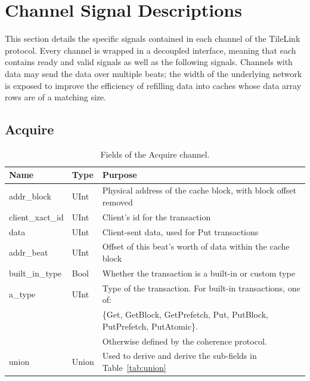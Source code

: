 \section{Channel Signal Descriptions}
\label{s.types}

This section details the specific signals contained in each channel of the TileLink protocol.
Every channel is wrapped in a decoupled interface, meaning that each contains ready and valid signals as well as the following signals.
Channels with data may send the data over multiple beats; the width of the underlying network is exposed to improve the efficiency of refilling data into caches whose data array rows are of a matching size.

\subsection{Acquire}

\begin{table}[ht]
\begin{center}
\begin{tabular}{|l|l|l|}
    \hline
    Name & Type & Purpose \\ \hline \hline
addr\_block & UInt & Physical address of the cache block, with block offset removed \\ \hline
client\_xact\_id & UInt & Client's id for the transaction \\ \hline
data & UInt & Client-sent data, used for Put transactions \\ \hline
addr\_beat & UInt & Offset of this beat's worth of data within the cache block \\ \hline
built\_in\_type & Bool & Whether the transaction is a built-in or custom type \\ \hline
a\_type & UInt & Type of the transaction. For built-in transactions, one of: \\
        &      & \{Get, GetBlock, GetPrefetch, Put, PutBlock, PutPrefetch, PutAtomic\}. \\
        &      &  Otherwise defined by the coherence protocol. \\ \hline
union & Union & Used to derive and derive the sub-fields in Table~\ref{tab:union} \\ \hline
\end{tabular}
\end{center}
\caption{Fields of the Acquire channel.}
\label{tab:acquire}
\end{table}

